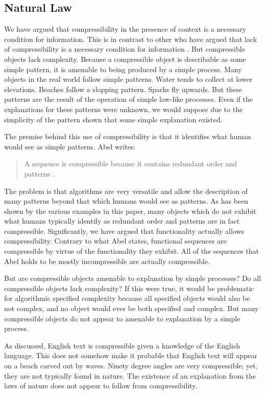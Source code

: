 \subsection{Natural Law}
We have argued that compressibility in the presence of context is a necessary condition for information.
This is in contrast to other who have argued that lack of compressibility is a necessary condition for information \citep{Abel2005}.
But compressible objects lack complexity.
Because a compressible object is describable as some simple pattern, it is amenable to being produced by a simple process.
Many objects in the real world follow simple patterns.
Water tends to collect at lower elevations.
Beaches follow a slopping pattern.
Sparks fly upwards.
But these patterns are the result of the operation of simple law-like processes.
Even if the explanations for these patterns were unknown, we would suppose due to the simplicity of the pattern shown that some simple explanation existed.

The premise behind this use of compressibility is that it identifies what human would see as simple patterns.
Abel writes:
\begin{quotation}
    A sequence is compressible because it contains redundant order and patterns \citep{Abel2005}.
\end{quotation}
The problem is that algorithms are very versatile and allow the description of many patterns beyond that which humans would see as patterns.
As has been shown by the various examples in this paper, many objects which do not exhibit what humans typically identify as redundant order and patterns are in fact compressible.
Significantly, we have argued that functionality actually allows compressibility.
Contrary to what Abel states, functional sequences are compressible by virtue of the functionality they exhibit.
All of the sequences that Abel holds to be mostly incompressible are actually compressible.

But are compressible objects amenable to explanation by simple processes?
Do all compressible objects lack complexity?
If this were true, it would be problematic for algorithmic specified complexity because all specified objects would also be not complex, and no object would ever be both specified and complex.
But many compressible objects do not appear to amenable to explanation by a simple process.

As discussed, English text is compressible given a knowledge of the English language.
This does not somehow make it probable that English text will appear on a beach carved out by waves.
Ninety degree angles are very compressible; yet, they are not typically found in nature.
The existence of an explanation from the laws of nature does not appear to follow from compressibility.

